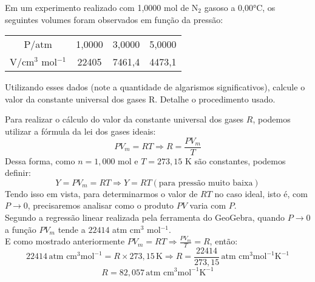 \begin{xcs}
    Em um experimento realizado com 1,0000 mol de N\(_2\) gasoso a 0,00°C, os
    seguintes volumes foram observados em função da pressão: 
    \begin{center}
    \begin{tabular}{c | c c c}
    \hline
        P/atm & 1,0000 & 3,0000 & 5,0000\\
        V/cm\(^3\) mol\(^{-1}\) & 22405 & 7461,4 & 4473,1\\
    \hline
    \end{tabular}
    \end{center}
    Utilizando esses dados (note a quantidade de algarismos significativos),
    calcule o valor da constante universal dos gases R. Detalhe o procedimento
    usado.
\end{xcs}
\begin{rsl}
    
    Para realizar o cálculo do valor da constante universal dos gases \( R \),
    podemos utilizar a fórmula da lei dos gases ideais: 
    \[ PV_m = RT \Rightarrow R = \frac{PV_m}{T} \]
    Dessa forma, como \( n = 1,000 \) mol e \( T = 273,15 \) K são constantes,
    podemos definir:
    \[Y = PV_m = RT \Rightarrow Y = RT (\text{para pressão
    muito baixa})\]
    Tendo isso em vista, para determinarmos o valor de \( RT \) no caso ideal, 
    isto é, com \( P \to 0 \), precisaremos analisar como o produto \( PV \)
    varia com \( P \). \\
    Segundo a regressão linear realizada pela ferramenta do GeoGebra, quando \(
    P \to 0 \) a função \( PV_m \) tende a \( 22414 \) atm cm\(^3\)
    mol\(^{-1}\). \\
    E como mostrado anteriormente \( PV_m = RT \Rightarrow
    \frac{PV_m}{T} = R \), então:
    \[22414 \, \text{atm cm}^3 \text{mol}^{-1} = R \times 273,15 \, \text{K}
    \Rightarrow R = \frac{22414}{273,15} \, \text{atm cm}^3
    \text{mol}^{-1} \text{K}^{-1}\]
    \[R = 82,057 \, \text{atm cm}^3 \text{mol}^{-1} \text{K}^{-1}\]
    
\end{rsl}
